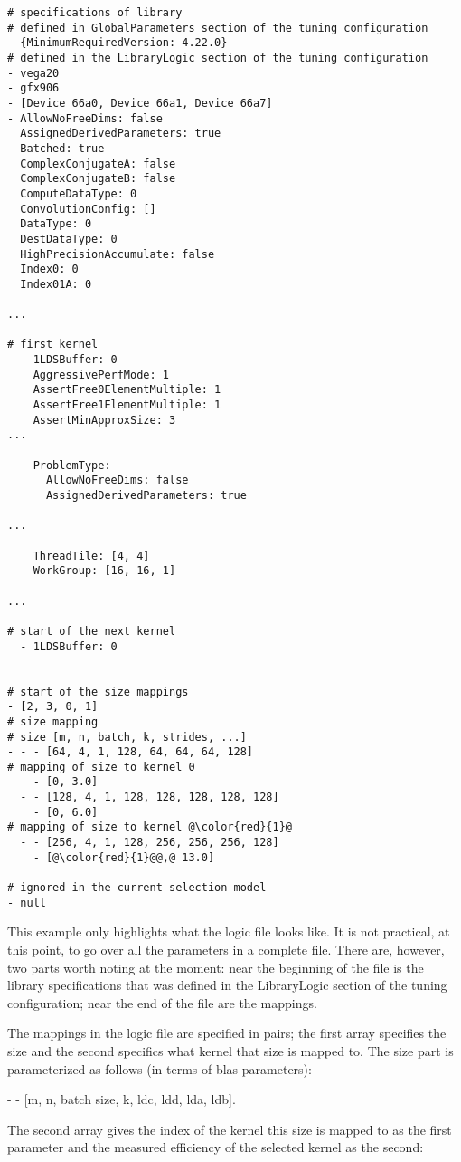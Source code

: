 \documentclass[]{article}
\begin{document}
\begin{verbatim}
# specifications of library
# defined in GlobalParameters section of the tuning configuration
- {MinimumRequiredVersion: 4.22.0}
# defined in the LibraryLogic section of the tuning configuration
- vega20
- gfx906
- [Device 66a0, Device 66a1, Device 66a7]
- AllowNoFreeDims: false
  AssignedDerivedParameters: true
  Batched: true
  ComplexConjugateA: false
  ComplexConjugateB: false
  ComputeDataType: 0
  ConvolutionConfig: []
  DataType: 0
  DestDataType: 0
  HighPrecisionAccumulate: false
  Index0: 0
  Index01A: 0

...

# first kernel
- - 1LDSBuffer: 0
    AggressivePerfMode: 1
    AssertFree0ElementMultiple: 1
    AssertFree1ElementMultiple: 1
    AssertMinApproxSize: 3
...

    ProblemType:
      AllowNoFreeDims: false
      AssignedDerivedParameters: true

...

    ThreadTile: [4, 4]
    WorkGroup: [16, 16, 1]

...

# start of the next kernel
  - 1LDSBuffer: 0


# start of the size mappings
- [2, 3, 0, 1]
# size mapping
# size [m, n, batch, k, strides, ...]
- - - [64, 4, 1, 128, 64, 64, 64, 128]
# mapping of size to kernel 0
    - [0, 3.0]
  - - [128, 4, 1, 128, 128, 128, 128, 128]
    - [0, 6.0]
# mapping of size to kernel @\color{red}{1}@
  - - [256, 4, 1, 128, 256, 256, 256, 128]
    - [@\color{red}{1}@@,@ 13.0]

# ignored in the current selection model
- null

\end{verbatim}
\noindent
This example only highlights what the logic file looks like. It is not practical, at this point, to go over all the parameters in a complete file. There are, however, two parts worth noting at the moment: near the beginning of the file is the library specifications that was defined in the LibraryLogic section of the tuning configuration; near the end of the file are the mappings.

The mappings in the logic file are specified in pairs; the first array specifies the size and the second specifics what kernel that size is mapped to. The size part is parameterized as follows (in terms of blas parameters):

\begin{center}
 	- - [m, n, batch size, k, ldc, ldd, lda, ldb].
\end{center}
\noindent
The second array gives the index of the kernel this size is mapped to as the first parameter and the measured efficiency of the selected kernel as the second:
\end{document}
